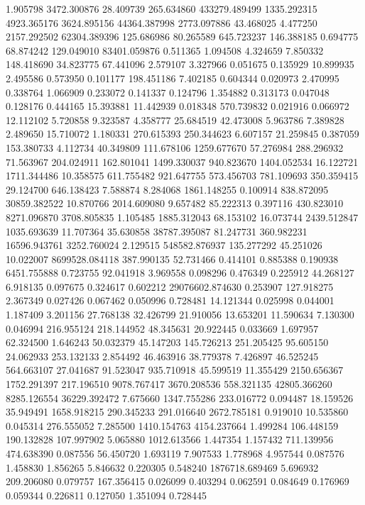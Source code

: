 1.905798
3472.300876
28.409739
265.634860
433279.489499
1335.292315
4923.365176
3624.895156
44364.387998
2773.097886
43.468025
4.477250
2157.292502
62304.389396
125.686986
80.265589
645.723237
146.388185
0.694775
68.874242
129.049010
83401.059876
0.511365
1.094508
4.324659
7.850332
148.418690
34.823775
67.441096
2.579107
3.327966
0.051675
0.135929
10.899935
2.495586
0.573950
0.101177
198.451186
7.402185
0.604344
0.020973
2.470995
0.338764
1.066909
0.233072
0.141337
0.124796
1.354882
0.313173
0.047048
0.128176
0.444165
15.393881
11.442939
0.018348
570.739832
0.021916
0.066972
12.112102
5.720858
9.323587
4.358777
25.684519
42.473008
5.963786
7.389828
2.489650
15.710072
1.180331
270.615393
250.344623
6.607157
21.259845
0.387059
153.380733
4.112734
40.349809
111.678106
1259.677670
57.276984
288.296932
71.563967
204.024911
162.801041
1499.330037
940.823670
1404.052534
16.122721
1711.344486
10.358575
611.755482
921.647755
573.456703
781.109693
350.359415
29.124700
646.138423
7.588874
8.284068
1861.148255
0.100914
838.872095
30859.382522
10.870766
2014.609080
9.657482
85.222313
0.397116
430.823010
8271.096870
3708.805835
1.105485
1885.312043
68.153102
16.073744
2439.512847
1035.693639
11.707364
35.630858
38787.395087
81.247731
360.982231
16596.943761
3252.760024
2.129515
548582.876937
135.277292
45.251026
10.022007
8699528.084118
387.990135
52.731466
0.414101
0.885388
0.190938
6451.755888
0.723755
92.041918
3.969558
0.098296
0.476349
0.225912
44.268127
6.918135
0.097675
0.324617
0.602212
29076602.874630
0.253907
127.918275
2.367349
0.027426
0.067462
0.050996
0.728481
14.121344
0.025998
0.044001
1.187409
3.201156
27.768138
32.426799
21.910056
13.653201
11.590634
7.130300
0.046994
216.955124
218.144952
48.345631
20.922445
0.033669
1.697957
62.324500
1.646243
50.032379
45.147203
145.726213
251.205425
95.605150
24.062933
253.132133
2.854492
46.463916
38.779378
7.426897
46.525245
564.663107
27.041687
91.523047
935.710918
45.599519
11.355429
2150.656367
1752.291397
217.196510
9078.767417
3670.208536
558.321135
42805.366260
8285.126554
36229.392472
7.675660
1347.755286
233.016772
0.094487
18.159526
35.949491
1658.918215
290.345233
291.016640
2672.785181
0.919010
10.535860
0.045314
276.555052
7.285500
1410.154763
4154.237664
1.499284
106.448159
190.132828
107.997902
5.065880
1012.613566
1.447354
1.157432
711.139956
474.638390
0.087556
56.450720
1.693119
7.907533
1.778968
4.957544
0.087576
1.458830
1.856265
5.846632
0.220305
0.548240
1876718.689469
5.696932
209.206080
0.079757
167.356415
0.026099
0.403294
0.062591
0.084649
0.176969
0.059344
0.226811
0.127050
1.351094
0.728445
